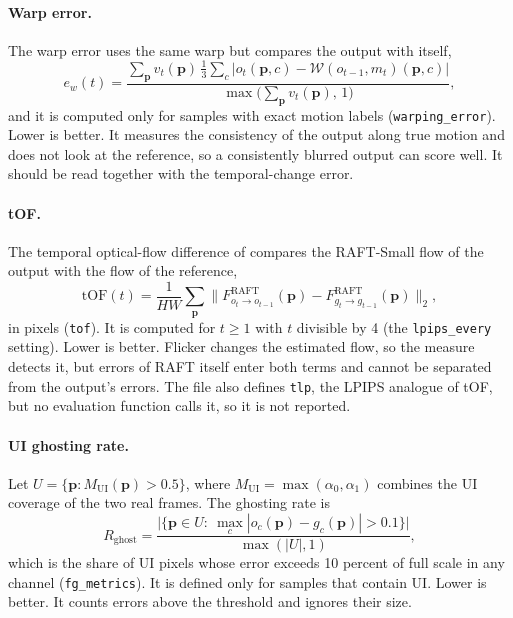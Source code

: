 \paragraph{Warp error.} The warp error uses the same warp but compares the output with itself,
\begin{equation}
e_{w}(t)=\frac{\sum_{\mathbf p}v_t(\mathbf p)\,\tfrac13\sum_c\big|o_t(\mathbf p,c)-\mathcal W(o_{t-1},m_t)(\mathbf p,c)\big|}{\max\big(\sum_{\mathbf p}v_t(\mathbf p),\,1\big)},\label{eq:bg-we}
\end{equation}
and it is computed only for samples with exact motion labels (\texttt{warping\_error}). Lower is better. It measures the consistency of the output along true motion and does not look at the reference, so a consistently blurred output can score well. It should be read together with the temporal-change error.

\paragraph{tOF.} The temporal optical-flow difference of \cite{chu2020tecogan} compares the RAFT-Small flow of the output with the flow of the reference,
\begin{equation}
\mathrm{tOF}(t)=\frac{1}{HW}\sum_{\mathbf p}\big\|F^{\text{RAFT}}_{o_t\to o_{t-1}}(\mathbf p)-F^{\text{RAFT}}_{g_t\to g_{t-1}}(\mathbf p)\big\|_2,\label{eq:bg-tof}
\end{equation}
in pixels (\texttt{tof}). It is computed for $t\ge1$ with $t$ divisible by 4 (the \texttt{lpips\_every} setting). Lower is better. Flicker changes the estimated flow, so the measure detects it, but errors of RAFT itself enter both terms and cannot be separated from the output's errors. The file also defines \texttt{tlp}, the LPIPS analogue of tOF, but no evaluation function calls it, so it is not reported.

\paragraph{UI ghosting rate.} Let $U=\{\mathbf p: M_{\text{UI}}(\mathbf p)>0.5\}$, where $M_{\text{UI}}=\max(\alpha_0,\alpha_1)$ combines the UI coverage of the two real frames. The ghosting rate is
\begin{equation}
R_{\text{ghost}}=\frac{\big|\{\mathbf p\in U:\ \max_c|o_c(\mathbf p)-g_c(\mathbf p)|>0.1\}\big|}{\max(|U|,1)},\label{eq:bg-ghost}
\end{equation}
which is the share of UI pixels whose error exceeds 10 percent of full scale in any channel (\texttt{fg\_metrics}). It is defined only for samples that contain UI. Lower is better. It counts errors above the threshold and ignores their size.

